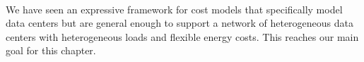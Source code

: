 
\paragraph{} We have seen an expressive framework for cost models that specifically model data centers but are general enough to support a network of heterogeneous data centers with heterogeneous loads and flexible energy costs. This reaches our main goal for this chapter.